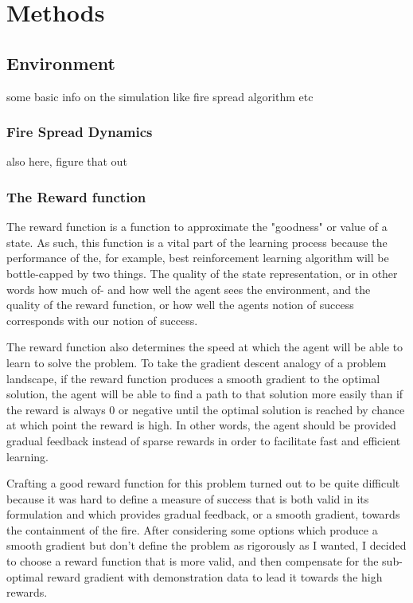 \section{Methods}\label{sec:methods}

\subsection{Environment}\label{sec:environment}
some basic info on the simulation like fire spread algorithm etc

\subsubsection{Fire Spread Dynamics}\label{sec:fire_spread}
also here, figure that out

\subsubsection{The Reward function}\label{sec:reward_function}
The reward function is a function to approximate the "goodness" or value of a state. As such, this function is a vital part of the learning process because the performance of the, for example, best reinforcement learning algorithm will be bottle-capped by two things. The quality of the state representation, or in other words how much of- and how well the agent sees the environment, and the quality of the reward function, or how well the agents notion of success corresponds with our notion of success. 

The reward function also determines the speed at which the agent will be able to learn to solve the problem. To take the gradient descent analogy of a problem landscape, if the reward function produces a smooth gradient to the optimal solution, the agent will be able to find a path to that solution more easily than if the reward is always 0 or negative until the optimal solution is reached by chance at which point the reward is high. In other words, the agent should be provided gradual feedback instead of sparse rewards in order to facilitate fast and efficient learning.

Crafting a good reward function for this problem turned out to be quite difficult because it was hard to define a measure of success that is both valid in its formulation and which provides gradual feedback, or a smooth gradient, towards the containment of the fire. After considering some options which produce a smooth gradient but don't define the problem as rigorously as I wanted, I decided to choose a reward function that is more valid, and then compensate for the sub-optimal reward gradient with demonstration data to lead it towards the high rewards.

